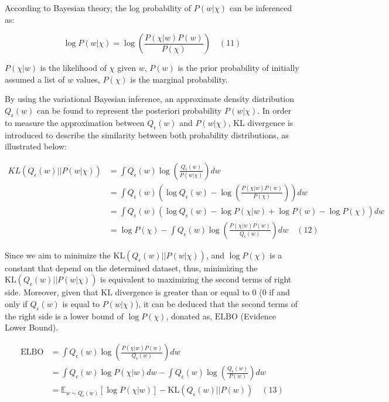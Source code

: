 According to Bayesian theory, the log probability of $P(w|\chi)$ can be inferenced as:

$$
\log P(w|\chi) = \log \left(\frac{P(\chi|w)P(w)}{P(\chi)}\right) \quad (11)
$$

$P(\chi|w)$ is the likelihood of $\chi$ given $w$, $P(w)$ is the prior probability of initially assumed a list of $w$ values, $P(\chi)$ is the marginal probability.

By using the variational Bayesian inference, an approximate density distribution $Q_\epsilon(w)$ can be found to represent the posteriori probability $P(w|\chi)$. In order to measure the approximation between $Q_\epsilon(w)$ and $P(w|\chi)$, KL divergence is introduced to describe the similarity between both probability distributions, as illustrated below:

$$
\begin{aligned}
KL(Q_\epsilon(w)||P(w|\chi)) &= \int Q_\epsilon(w) \log \left( \frac{Q_\epsilon(w)}{P(w|\chi)} \right) dw \\
&= \int Q_\epsilon(w) \left( \log Q_\epsilon(w) - \log \left( \frac{P(\chi|w)P(w)}{P(\chi)} \right) \right) dw \\
&= \int Q_\epsilon(w) \left( \log Q_\epsilon(w) - \log P(\chi|w) + \log P(w) - \log P(\chi) \right) dw \\
&= \log P(\chi) - \int Q_\epsilon(w) \log \left( \frac{P(\chi|w)P(w)}{Q_\epsilon(w)} \right) dw  \quad (12)
\end{aligned}
$$

Since we aim to minimize the $\mathrm{KL}(Q_\epsilon(w)||P(w|\chi))$, and $\log P(\chi)$ is a constant that depend on the determined dataset, thus, minimizing the $\mathrm{KL}(Q_\epsilon(w)||P(w|\chi))$ is equivalent to maximizing the second terms of right side. Moreover, given that $\mathrm{KL}$ divergence is greater than or equal to 0 (0 if and only if $Q_\epsilon(w)$ is equal to $P(w|\chi)$), it can be deduced that the second terms of the right side is a lower bound of $\log P(\chi)$, donated as, $\mathrm{ELBO}$ (Evidence Lower Bound).

$$
\begin{aligned}
\mathrm{ELBO} &= \int Q_\epsilon(w) \log \left( \frac{P(\chi|w)P(w)}{Q_\epsilon(w)} \right) dw \\
&= \int Q_\epsilon(w) \log P(\chi|w) dw - \int Q_\epsilon(w) \log \left( \frac{Q_\epsilon(w)}{P(w)} \right) dw \\
&= \mathbb{E}_{w \sim Q_\epsilon(w)}[\log P(\chi|w)] - \mathrm{KL}(Q_\epsilon(w)||P(w))  \quad (13)
\end{aligned}
$$

